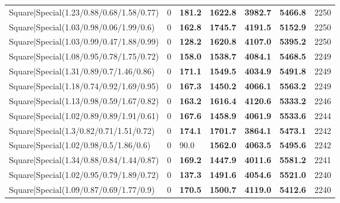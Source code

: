 \begin{tabular}{lrllllr}
 Square|Special(1.23/0.88/0.68/1.58/0.77)                      &             0   & \textbf{181.2} & \textbf{1622.8} & \textbf{3982.7} & \textbf{5466.8} &         2250 \\
 Square|Special(1.03/0.98/0.06/1.99/0.6)                       &             0   & \textbf{162.8} & \textbf{1745.7} & \textbf{4191.5} & \textbf{5152.9} &         2250 \\
 Square|Special(1.03/0.99/0.47/1.88/0.99)                      &             0   & \textbf{128.2} & \textbf{1620.8} & \textbf{4107.0} & \textbf{5395.2} &         2250 \\
 Square|Special(1.08/0.95/0.78/1.75/0.72)                      &             0   & \textbf{158.0} & \textbf{1538.7} & \textbf{4084.1} & \textbf{5468.5} &         2249 \\
 Square|Special(1.31/0.89/0.7/1.46/0.86)                       &             0   & \textbf{171.1} & \textbf{1549.5} & \textbf{4034.9} & \textbf{5491.8} &         2249 \\
 Square|Special(1.18/0.74/0.92/1.69/0.95)                      &             0   & \textbf{167.3} & \textbf{1450.2} & \textbf{4066.1} & \textbf{5563.2} &         2249 \\
 Square|Special(1.13/0.98/0.59/1.67/0.82)                      &             0   & \textbf{163.2} & \textbf{1616.4} & \textbf{4120.6} & \textbf{5333.2} &         2246 \\
 Square|Special(1.02/0.89/0.89/1.91/0.61)                      &             0   & \textbf{167.6} & \textbf{1458.9} & \textbf{4061.9} & \textbf{5533.6} &         2244 \\
 Square|Special(1.3/0.82/0.71/1.51/0.72)                       &             0   & \textbf{174.1} & \textbf{1701.7} & \textbf{3864.1} & \textbf{5473.1} &         2242 \\
 Square|Special(1.02/0.98/0.5/1.86/0.6)                        &             0   & 90.0           & \textbf{1562.0} & \textbf{4063.5} & \textbf{5495.6} &         2242 \\
 Square|Special(1.34/0.88/0.84/1.44/0.87)                      &             0   & \textbf{169.2} & \textbf{1447.9} & \textbf{4011.6} & \textbf{5581.2} &         2241 \\
 Square|Special(1.02/0.95/0.79/1.89/0.72)                      &             0   & \textbf{137.3} & \textbf{1491.6} & \textbf{4054.6} & \textbf{5521.0} &         2240 \\
 Square|Special(1.09/0.87/0.69/1.77/0.9)                       &             0   & \textbf{170.5} & \textbf{1500.7} & \textbf{4119.0} & \textbf{5412.6} &         2240 \\

\end{tabular}
